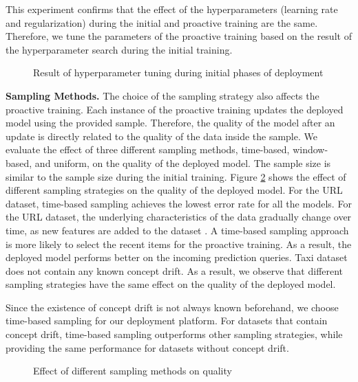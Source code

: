 This experiment confirms that the effect of the hyperparameters (learning rate and regularization) during the initial and proactive training are the same.
Therefore, we tune the parameters of the proactive training based on the result of the hyperparameter search during the initial training.

\begin{figure}[!h]
\centering
\resizebox{\columnwidth}{!}{}
\caption{Result of hyperparameter tuning during initial phases of deployment}
\label{hyper-param-figure}
\end{figure}

\textbf{Sampling Methods.}
The choice of the sampling strategy also affects the proactive training.
Each instance of the proactive training updates the deployed model using the provided sample.
Therefore, the quality of the model after an update is directly related to the quality of the data inside the sample.
We evaluate the effect of three different sampling methods, time-based, window-based, and uniform, on the quality of the deployed model.
The sample size is similar to the sample size during the initial training.
Figure \ref{sampling-method-figure} shows the effect of different sampling strategies on the quality of the deployed model.
For the URL dataset, time-based sampling achieves the lowest error rate for all the models.
For the URL dataset, the underlying characteristics of the data gradually change over time, as new features are added to the dataset \cite{ma2009identifying}.
A time-based sampling approach is more likely to select the recent items for the proactive training.
As a result, the deployed model performs better on the incoming prediction queries.
Taxi dataset does not contain any known concept drift.
As a result, we observe that different sampling strategies have the same effect on the quality of the deployed model.

Since the existence of concept drift is not always known beforehand, we choose time-based sampling for our deployment platform.
For datasets that contain concept drift, time-based sampling outperforms other sampling strategies, while providing the same performance for datasets without concept drift.

\begin{figure}[!h]
\centering
\resizebox{\columnwidth}{!}{}
\caption{Effect of different sampling methods on quality}
\label{sampling-method-figure}
\end{figure}


